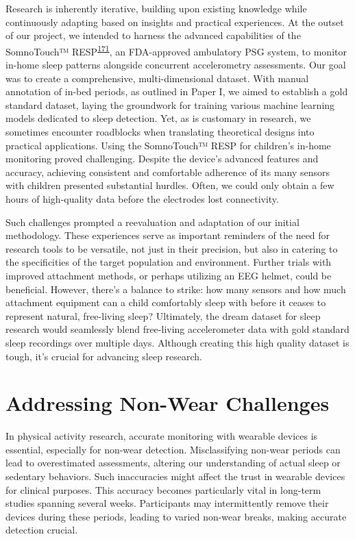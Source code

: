 \documentclass[
  10pt,
]{scrbook}
\begin{document}
Research is inherently iterative, building upon existing knowledge while
continuously adapting based on insights and practical experiences. At
the outset of our project, we intended to harness the advanced
capabilities of the SomnoTouch™️
RESP\textsuperscript{\protect\hyperlink{ref-somnotouch}{171}}, an
FDA-approved ambulatory PSG system, to monitor in-home sleep patterns
alongside concurrent accelerometry assessments. Our goal was to create a
comprehensive, multi-dimensional dataset. With manual annotation of
in-bed periods, as outlined in Paper I, we aimed to establish a gold
standard dataset, laying the groundwork for training various machine
learning models dedicated to sleep detection. Yet, as is customary in
research, we sometimes encounter roadblocks when translating theoretical
designs into practical applications. Using the SomnoTouch™️ RESP for
children's in-home monitoring proved challenging. Despite the device's
advanced features and accuracy, achieving consistent and comfortable
adherence of its many sensors with children presented substantial
hurdles. Often, we could only obtain a few hours of high-quality data
before the electrodes lost connectivity.

Such challenges prompted a reevaluation and adaptation of our initial
methodology. These experiences serve as important reminders of the need
for research tools to be versatile, not just in their precision, but
also in catering to the specificities of the target population and
environment. Further trials with improved attachment methods, or perhaps
utilizing an EEG helmet, could be beneficial. However, there's a balance
to strike: how many sensors and how much attachment equipment can a
child comfortably sleep with before it ceases to represent natural,
free-living sleep? Ultimately, the dream dataset for sleep research
would seamlessly blend free-living accelerometer data with gold standard
sleep recordings over multiple days. Although creating this high quality
dataset is tough, it's crucial for advancing sleep research.

\hypertarget{addressing-non-wear-challenges}{%
\section{Addressing Non-Wear
Challenges}\label{addressing-non-wear-challenges}}

In physical activity research, accurate monitoring with wearable devices
is essential, especially for non-wear detection. Misclassifying non-wear
periods can lead to overestimated assessments, altering our
understanding of actual sleep or sedentary behaviors. Such inaccuracies
might affect the trust in wearable devices for clinical purposes. This
accuracy becomes particularly vital in long-term studies spanning
several weeks. Participants may intermittently remove their devices
during these periods, leading to varied non-wear breaks, making accurate
detection crucial.
\end{document}
